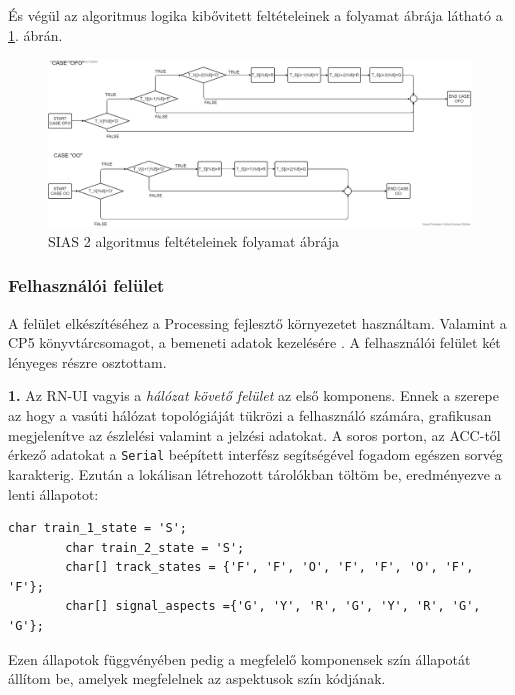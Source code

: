 \documentclass[a4paper,12pt]{article}
\begin{document}
És végül az algoritmus logika kibővitett feltételeinek a folyamat ábrája látható a \ref{fig:SIAS2flowchart}. ábrán.

\begin{figure}[!htp]
	\includegraphics[width=\linewidth]{images/SIAS2_module_flow_chart.png}
    \caption[SIAS 2 folyamat ábra]{SIAS 2 algoritmus feltételeinek folyamat ábrája}
	\label{fig:SIAS2flowchart}
\end{figure}

\newpage
\subsubsection{Felhasználói felület}
A felület elkészítéséhez a Processing fejlesztő környezetet használtam. Valamint a CP5 könyvtárcsomagot, a bemeneti adatok kezelésére \cite{as15}.
A felhasználói felület két lényeges részre osztottam.

\textbf{1.} Az RN-UI vagyis a \textit{hálózat követő felület} az első komponens.
Ennek a szerepe az hogy a vasúti hálózat topológiáját tükrözi a felhasználó számára, grafikusan megjelenítve az észlelési valamint a jelzési adatokat.
A soros porton, az ACC-től érkező adatokat a \texttt{Serial} beépített interfész segítségével fogadom egészen sorvég karakterig.
Ezután a lokálisan létrehozott tárolókban töltöm be, eredményezve a lenti állapotot:
\begin{minipage}{\linewidth}
    \begin{lstlisting}[style=CStyle, caption={Megérkezett adatok tárolása a GUI-nál},label=code:gui_data]
        char train_1_state = 'S';
        char train_2_state = 'S';
        char[] track_states = {'F', 'F', 'O', 'F', 'F', 'O', 'F', 'F'};
        char[] signal_aspects ={'G', 'Y', 'R', 'G', 'Y', 'R', 'G', 'G'};
        \end{lstlisting}
\end{minipage}
Ezen állapotok függvényében pedig a megfelelő komponensek szín állapotát állítom be, amelyek megfelelnek az aspektusok szín kódjának.
\end{document}
